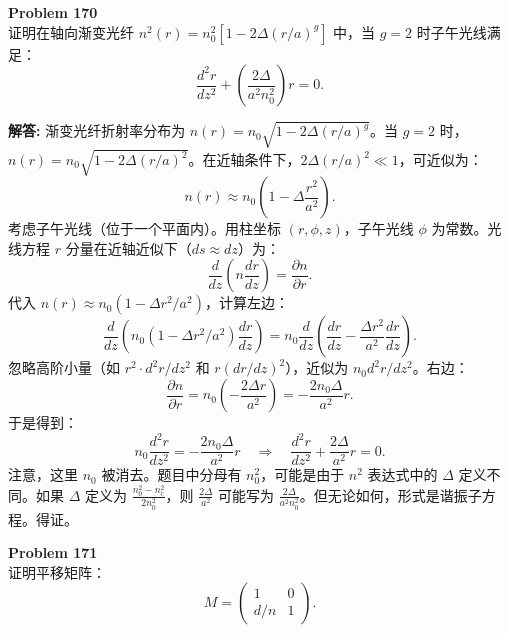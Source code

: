 \documentclass[12pt, a4paper, oneside]{ctexart}
\newenvironment{solution}{\par\noindent\textbf{解答:}\quad}{\par}
\begin{document}
\begin{mdframed}[backgroundcolor=gray!10, linewidth=0pt]
    \textbf{Problem 170} \\
    证明在轴向渐变光纤 $n^2(r) = n_0^2 [1 - 2\Delta (r/a)^g]$ 中，当 $g=2$ 时子午光线满足：
    \[
    \frac{d^2 r}{dz^2} + \left( \frac{2\Delta}{a^2 n_0^2} \right) r = 0.
    \]
\end{mdframed}
\begin{solution}
    渐变光纤折射率分布为 $n(r) = n_0 \sqrt{1 - 2\Delta (r/a)^g}$。当 $g=2$ 时，$n(r) = n_0 \sqrt{1 - 2\Delta (r/a)^2}$。在近轴条件下，$2\Delta (r/a)^2 \ll 1$，可近似为：
    \[
    n(r) \approx n_0 \left( 1 - \Delta \frac{r^2}{a^2} \right).
    \]
    考虑子午光线（位于一个平面内）。用柱坐标 $(r, \phi, z)$，子午光线 $\phi$ 为常数。光线方程 $r$ 分量在近轴近似下（$ds \approx dz$）为：
    \[
    \frac{d}{dz} \left( n \frac{dr}{dz} \right) = \frac{\partial n}{\partial r}.
    \]
    代入 $n(r) \approx n_0 (1 - \Delta r^2/a^2)$，计算左边：
    \[
    \frac{d}{dz} \left( n_0 (1 - \Delta r^2/a^2) \frac{dr}{dz} \right) = n_0 \frac{d}{dz} \left( \frac{dr}{dz} - \frac{\Delta r^2}{a^2} \frac{dr}{dz} \right).
    \]
    忽略高阶小量（如 $r^2 \cdot d^2r/dz^2$ 和 $r (dr/dz)^2$），近似为 $n_0 d^2r/dz^2$。右边：
    \[
    \frac{\partial n}{\partial r} = n_0 \left( - \frac{2\Delta r}{a^2} \right) = -\frac{2n_0 \Delta}{a^2} r.
    \]
    于是得到：
    \[
    n_0 \frac{d^2 r}{dz^2} = -\frac{2n_0 \Delta}{a^2} r \quad \Rightarrow \quad \frac{d^2 r}{dz^2} + \frac{2\Delta}{a^2} r = 0.
    \]
    注意，这里 $n_0$ 被消去。题目中分母有 $n_0^2$，可能是由于 $n^2$ 表达式中的 $\Delta$ 定义不同。如果 $\Delta$ 定义为 $\frac{n_0^2 - n_c^2}{2n_0^2}$，则 $\frac{2\Delta}{a^2}$ 可能写为 $\frac{2\Delta}{a^2 n_0^2}$。但无论如何，形式是谐振子方程。得证。
\end{solution}
\begin{mdframed}[backgroundcolor=gray!10, linewidth=0pt]
    \textbf{Problem 171} \\
    证明平移矩阵：
    \[
    M = \begin{pmatrix} 1 & 0 \\ d/n & 1 \end{pmatrix}.
    \]
\end{mdframed}
\end{document}
